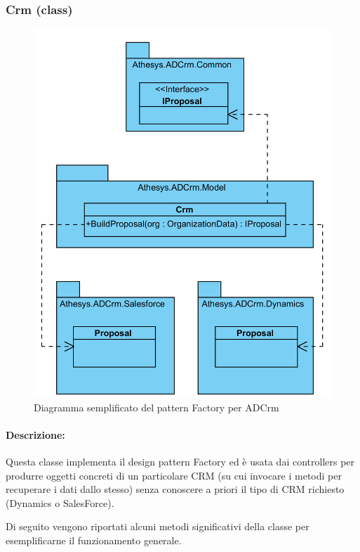 \subsubsection{Crm (class)} \label{crmClass}
\begin{figure}[H]
	\centering
	\includegraphics[width=\linewidth]{images/factoryInADCrm}
	\caption{Diagramma semplificato del pattern Factory per ADCrm}
	\label{fig:factoryInADCrm}
\end{figure}
\paragraph{Descrizione:}
Questa classe implementa il design pattern Factory ed è usata dai controllers per produrre oggetti concreti di un particolare \gls{CRM} (su cui invocare i metodi per recuperare i dati dallo stesso) senza conoscere a priori il tipo di \gls{CRM} richiesto (Dynamics o SalesForce).


Di seguito vengono riportati alcuni metodi significativi della classe per esemplificarne il funzionamento generale.



